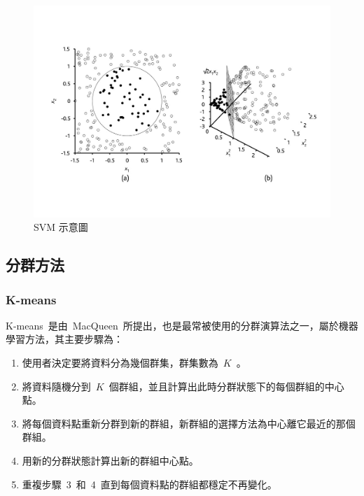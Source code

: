 \begin{figure}[hbtp]
  \begin{center}
    \includegraphics[width=1.0\textwidth]{figures/svm.jpg}
    \caption{SVM 示意圖}
    \label{fig:svm}
  \end{center}
\end{figure}

\subsection{分群方法}

\subsubsection{K-means}

K-means~是由~MacQueen\cite{macqueen67}~所提出，也是最常被使用的分群演算法之一，屬於機器學習方法，其主要步驟為：

\begin{enumerate}
\item 使用者決定要將資料分為幾個群集，群集數為~$K$~。
\item 將資料隨機分到~$K$~個群組，並且計算出此時分群狀態下的每個群組的中心點。
\item 將每個資料點重新分群到新的群組，新群組的選擇方法為中心離它最近的那個群組。
\item 用新的分群狀態計算出新的群組中心點。
\item 重複步驟~3~和~4~直到每個資料點的群組都穩定不再變化。
\end{enumerate}




